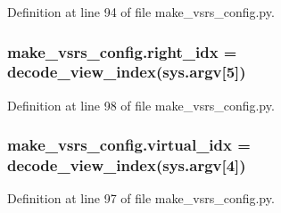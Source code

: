 Definition at line 94 of file make\+\_\+vsrs\+\_\+config.\+py.

\subsubsection[{\texorpdfstring{right\+\_\+idx}{right_idx}}]{\setlength{\rightskip}{0pt plus 5cm}make\+\_\+vsrs\+\_\+config.\+right\+\_\+idx = decode\+\_\+view\+\_\+index(sys.\+argv\mbox{[}5\mbox{]})}\hypertarget{namespacemake__vsrs__config_a31b0b1009f32743b1ffc27e78539235b}{}\label{namespacemake__vsrs__config_a31b0b1009f32743b1ffc27e78539235b}


Definition at line 98 of file make\+\_\+vsrs\+\_\+config.\+py.

\subsubsection[{\texorpdfstring{virtual\+\_\+idx}{virtual_idx}}]{\setlength{\rightskip}{0pt plus 5cm}make\+\_\+vsrs\+\_\+config.\+virtual\+\_\+idx = decode\+\_\+view\+\_\+index(sys.\+argv\mbox{[}4\mbox{]})}\hypertarget{namespacemake__vsrs__config_a942abb0bef473b35cee41ba20010380d}{}\label{namespacemake__vsrs__config_a942abb0bef473b35cee41ba20010380d}


Definition at line 97 of file make\+\_\+vsrs\+\_\+config.\+py.

